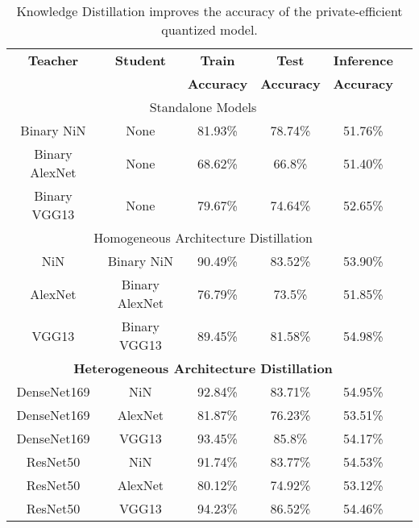 \begin{table}[!htb]
\begin{center}
\renewcommand\arraystretch{1.5}
\fontsize{6.5pt}{6.5pt}\selectfont
\begin{tabular}{|c|c|c|c|c|c|}
\hline
\textbf{Teacher} & \textbf{Student} & \textbf{Train}  & \textbf{Test}  & \textbf{Inference}  \\
&  & \textbf{Accuracy} & \textbf{Accuracy} & \textbf{Accuracy}  \\
\hline
\multicolumn{5}{|c|}{Standalone Models}\\
\hline
Binary NiN & None & 81.93\% & 78.74\% & 51.76\% \\
Binary AlexNet & None & 68.62\% & 66.8\% & 51.40\% \\
Binary VGG13 & None & 79.67\% & 74.64\% & 52.65\%\\
\hline
\multicolumn{5}{|c|}{Homogeneous Architecture Distillation}\\
\hline
NiN & Binary NiN & 90.49\% & 83.52\% & 53.90\% \\
AlexNet & Binary AlexNet & 76.79\% & 73.5\% & 51.85\% \\
VGG13 & Binary VGG13 & 89.45\% & 81.58\% & 54.98\%\\
\hline
\multicolumn{5}{|c|}{\textbf{Heterogeneous Architecture Distillation}}\\
\hline
DenseNet169 & NiN & 92.84\% & 83.71\% & 54.95\%\\
DenseNet169 & AlexNet & 81.87\% & 76.23\% & 53.51\%\\
DenseNet169 & VGG13 & 93.45\% & 85.8\% & 54.17\%\\
\hline
ResNet50 & NiN & 91.74\% & 83.77\% & 54.53\% \\
ResNet50 & AlexNet & 80.12\% & 74.92\% & 53.12\%\\
ResNet50 & VGG13 & 94.23\% & 86.52\% & 54.46\%\\
\hline
\end{tabular}
\end{center}
\caption{Knowledge Distillation improves the accuracy of the private-efficient quantized model.}
\label{kd}
\vspace{-0.2in}
\end{table}


